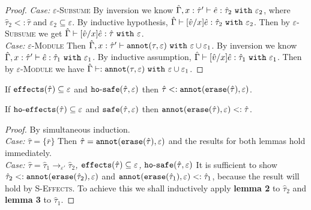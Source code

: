 \begin{appendix}
\begin{proof}
\textit{Case:} \textsc{$\varepsilon$-Subsume} By inversion we know $\hat \Gamma, x: \hat \tau' \vdash \hat e: \hat \tau_2~\mathtt{with}~ \varepsilon_2$, where $\hat \tau_2 <: \hat \tau$ and $\varepsilon_2 \subseteq \varepsilon$. By inductive hypothesis, $\hat \Gamma \vdash [\hat v/x]\hat e: \hat \tau_2~\mathtt{with}~ \varepsilon_2$. Then by \textsc{$\varepsilon$-Subsume} we get $\hat \Gamma \vdash [\hat v/x]\hat e: \hat \tau~\mathtt{with}~ \varepsilon$. \\

\textit{Case:} \textsc{$\varepsilon$-Module} Then $\hat \Gamma, x: \hat \tau' \vdash  \mathtt{annot}(\tau, \varepsilon)~\mathtt{with}~ \varepsilon \cup \varepsilon_1$. By inversion we know $\hat \Gamma, x: \hat \tau' \vdash \hat e: \hat \tau_1~\mathtt{with}~ \varepsilon_1$. By inductive assumption, $\hat \Gamma \vdash [\hat v/x]\hat e: \hat \tau_1~\mathtt{with}~ \varepsilon_1$. Then by \textsc{$\varepsilon$-Module} we have $\hat \Gamma \vdash : \mathtt{annot}(\tau, \varepsilon)~\mathtt{with}~ \varepsilon \cup \varepsilon_1$.
\end{proof}

\hrulefill

\begin{lemma}
If $\mathtt{effects}(\hat \tau) \subseteq \varepsilon$ and $\mathtt{ho \hbox{-} safe}(\hat \tau, \varepsilon)$ then $\hat \tau <: \mathtt{annot}(\mathtt{erase}(\hat \tau), \varepsilon)$.
\end{lemma}

\begin{lemma}
If $\mathtt{ho \hbox{-} effects}(\hat \tau) \subseteq \varepsilon$ and $\mathtt{safe}(\hat \tau, \varepsilon)$ then $\mathtt{annot(erase}(\hat \tau), \varepsilon) <: \hat \tau$.
\end{lemma}

\begin{proof}
By simultaneous induction.\\

\textit{Case:} $\hat \tau = \{ \bar r \}$ Then $\hat \tau = \mathtt{annot(erase}(\hat \tau), \varepsilon)$ and the results for both lemmas hold immediately. \\

\textit{Case: $\hat \tau = \hat \tau_1 \rightarrow_{\varepsilon'} \hat \tau_2$, $\mathtt{effects}(\hat \tau) \subseteq \varepsilon$, $\mathtt{ho \hbox{-} safe}(\hat \tau, \varepsilon)$} It is sufficient to show $\hat \tau_2 <: \mathtt{annot(erase}(\hat \tau_2), \varepsilon)$ and $\mathtt{annot(erase}(\hat \tau_1), \varepsilon) <: \hat \tau_1$, because the result will hold by \textsc{S-Effects}. To achieve this we shall inductively apply \textbf{lemma 2} to $\hat \tau_2$ and \textbf{lemma 3} to $\hat \tau_1$. 


\end{proof}
\end{appendix}
